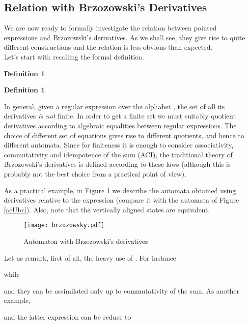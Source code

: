 \documentclass[preprint]{sigplanconf}
\newcounter{item}
\newtheorem{definition}[item]{Definition}
\begin{document}
\subsection{Relation with Brzozowski's Derivatives}
\label{relation}
We are now ready to formally investigate the relation
between pointed expressions and Brzozowski's derivatives.
As we shall see, they give rise to quite different constructions
and the relation is less obvious than expected.\\
Let's start with recalling the formal definition.
\begin{definition}

\end{definition}
\begin{definition}

\end{definition}

In general, given a regular expression  over the alphabet , 
the set 
of all its derivatives {\em is not} finite. In order to get a finite
set we must suitably quotient derivatives according to algebraic 
equalities between regular expressions. The choice of different 
set of equations gives rise
to different quotients, and hence to different automata. Since
for finiteness it is enough to consider associativity,
commutativity and idempotence of the sum (ACI), the traditional
theory of Brzozowski's derivatives is defined according to
these laws (although this is probably not the best choice from 
a practical point of view).

As a practical example, in Figure \ref{acUbc1} we describe 
the automata obtained using derivatives relative to the 
expression  (compare it
with the automata of Figure \ref{acUbc}). Also, note that the
vertically aligned states are equivalent.

\begin{figure}[htp]
\begin{center}
\texttt{[image: brzozowsky.pdf]}
\caption{Automaton with Brzozowski's derivatives\label{acUbc1}}
\end{center}
\end{figure}

\noindent
Let us remark, first of all, the heavy use of . For instance 

while
 
and they can be assimilated only up to commutativity of the sum. 
As another example,

and the latter expression can be reduce to
 
\end{document}
